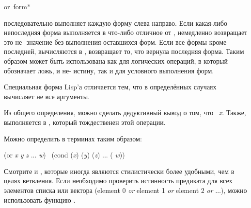 \begin{defmac}
or {\,form}*

 последовательно выполняет каждую
форму слева направо. Если какая-либо непоследняя форма выполняется в что-либо
отличное от {\false},  немедленно возвращает это не-{\false} значение
без выполнения оставшихся форм. Если все формы кроме последней, вычисляются в
{\false},  возвращает то, что вернула последняя форма.
Таким образом  может быть использована как для логических операций, 
в который {\false} обозначает ложь, и не-{\false} истину,
так и для условного выполнения форм.

Специальная форма Lisp'а  отличается тем, что в определённых случаях
вычисляет не все аргументы.

Из общего определения, можно сделать дедуктивный вывод о том, что  \EQ\ \emph{x}. Также,  выполняется в {\nil}, который
тождественен этой операции.

Можно определить  в терминах  таким образом:
\begin{lisp}
(or \emph{x} \emph{y} \emph{z} ... \emph{w}) \EQ\ (cond (\emph{x}) (\emph{y}) (\emph{z}) ... ({\true} \emph{w}))
\end{lisp}

Смотрите  и , которые иногда являются стилистически более
удобными, чем  в целях ветвления.
Если необходимо проверить истинность предиката для всех элементов списка или
вектора (element 0 \emph{or} element 1 \emph{or}
element 2 \emph{or} $\ldots$), можно использовать функцию .
\end{defmac}

\fi